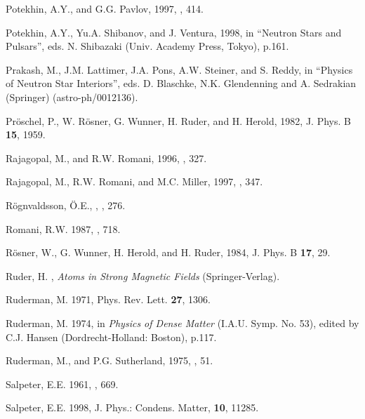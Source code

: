 \begin{references}
\harvarditem{}{}{}
Potekhin, A.Y., and G.G. Pavlov, 1997, , 414.

\harvarditem{}{}{}
Potekhin, A.Y., Yu.A. Shibanov, and J. Ventura, 1998, 
in ``Neutron Stars and Pulsars'', eds. N. Shibazaki \etal (Univ. 
Academy Press, Tokyo), p.161.

\harvarditem{}{}{}
Prakash, M., J.M. Lattimer, J.A. Pons, A.W. Steiner, and S. Reddy, 
in ``Physics of Neutron Star Interiors'', eds. D. Blaschke, N.K. Glendenning
and A. Sedrakian (Springer) (astro-ph/0012136).

\harvarditem{}{}{}
Pr\"oschel, P., W. R\"osner, G. Wunner, H. Ruder, and H. Herold,
1982, J. Phys. B {\bf 15}, 1959.

\harvarditem{}{}{}
Rajagopal, M., and R.W. Romani, 1996, , 327.

\harvarditem{}{}{}
Rajagopal, M., R.W. Romani, and M.C. Miller, 1997, , 347.


\harvarditem{}{}{}
R\"ognvaldsson, \"O.E., , , 276.

\harvarditem{}{}{}
Romani, R.W. 1987, , 718.

\harvarditem{}{}{}
R\"osner, W., G. Wunner, H. Herold, and H. Ruder,
1984, J. Phys. B {\bf 17}, 29.

\harvarditem{}{}{}
Ruder, H. , {\it Atoms in Strong Magnetic Fields}
(Springer-Verlag).

\harvarditem{}{}{}
Ruderman, M. 1971, Phys. Rev. Lett. {\bf 27}, 1306.

\harvarditem{}{}{}
Ruderman, M. 1974, in {\it Physics of Dense Matter} (I.A.U. Symp. No. 53),
edited by C.J. Hansen (Dordrecht-Holland: Boston), p.117.

\harvarditem{}{}{}
Ruderman, M., and P.G. Sutherland, 1975, , 51.

\harvarditem{}{}{}
Salpeter, E.E. 1961, , 669.

\harvarditem{}{}{}
Salpeter, E.E. 1998, J. Phys.: Condens. Matter, {\bf 10}, 11285.


\end{references}
